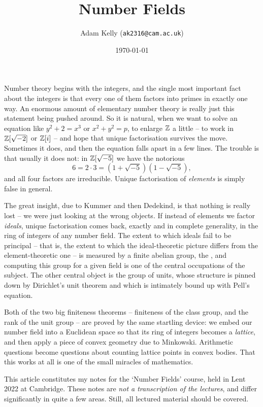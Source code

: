 \documentclass[a4paper]{scrartcl}
\title{Number Fields}
\author{Adam Kelly (\texttt{ak2316@cam.ac.uk})}
\date{\today}
\begin{document}
\maketitle

Number theory begins with the integers, and the single most important fact about the integers is that every one of them factors into primes in exactly one way. An enormous amount of elementary number theory is really just this statement being pushed around. So it is natural, when we want to solve an equation like $y^2 + 2 = x^3$ or $x^2 + y^2 = p$, to enlarge $\mathbb{Z}$ a little -- to work in $\mathbb{Z}[\sqrt{-2}]$ or $\mathbb{Z}[i]$ -- and hope that unique factorisation survives the move. Sometimes it does, and then the equation falls apart in a few lines. The trouble is that usually it does not: in $\mathbb{Z}[\sqrt{-5}]$ we have the notorious
$$6 = 2 \cdot 3 = (1 + \sqrt{-5})(1 - \sqrt{-5}),$$
and all four factors are irreducible. Unique factorisation of \emph{elements} is simply false in general.

The great insight, due to Kummer and then Dedekind, is that nothing is really lost -- we were just looking at the wrong objects. If instead of elements we factor \emph{ideals}, unique factorisation comes back, exactly and in complete generality, in the ring of integers of any number field. The extent to which ideals fail to be principal -- that is, the extent to which the ideal-theoretic picture differs from the element-theoretic one -- is measured by a finite abelian group, the , and computing this group for a given field is one of the central occupations of the subject. The other central object is the group of units, whose structure is pinned down by Dirichlet's unit theorem and which is intimately bound up with Pell's equation.

Both of the two big finiteness theorems -- finiteness of the class group, and the rank of the unit group -- are proved by the same startling device: we embed our number field into a Euclidean space so that its ring of integers becomes a \emph{lattice}, and then apply a piece of convex geometry due to Minkowski. Arithmetic questions become questions about counting lattice points in convex bodies. That this works at all is one of the small miracles of mathematics.

This article constitutes my notes for the `Number Fields' course, held in Lent 2022 at Cambridge. These notes are \emph{not a transcription of the lectures}, and differ significantly in quite a few areas. Still, all lectured material should be covered.
\end{document}
